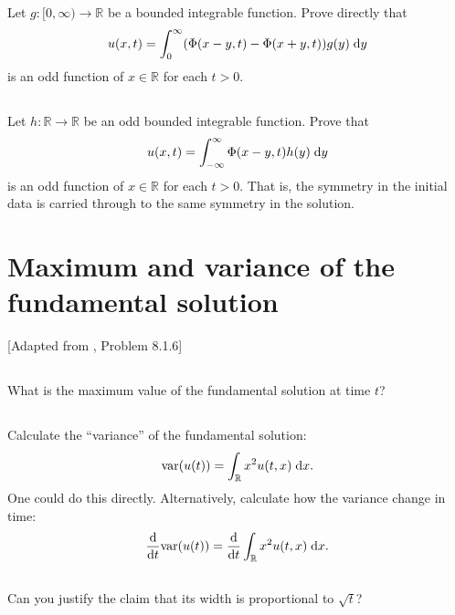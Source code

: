 \documentclass[11pt,letterpaper]{article}
\begin{document}
\subsection{}
Let $g:[0,\infty)\to\mathbb{R}$ be a bounded integrable function. Prove directly that
\begin{align}
    u(x,t)=\int_0^\infty (\Phi(x-y,t)-\Phi(x+y,t))g(y)\;\mathrm{d} y
\end{align}
is an odd function of $x\in\mathbb{R}$ for each $t>0$.

\subsection{}
Let $h:\mathbb{R}\to\mathbb{R}$ be an odd bounded integrable function. Prove that
\begin{align}
    u(x,t)=\int^\infty_{-\infty} \Phi(x-y,t)h(y)\;\mathrm{d} y
\end{align}
is an odd function of $x\in\mathbb{R}$ for each $t > 0$. That is, the symmetry in the initial data is carried through to the same symmetry in the solution.

\section{Maximum and variance of the fundamental solution}
[Adapted from \cite{Olver_14}, Problem 8.1.6]

\subsection{}
What is the maximum value of the fundamental solution at time $t$?

\subsection{}
Calculate the ``variance'' of the fundamental solution:
\begin{align}
    \text{var}(u(t)) = \int_\mathbb{R} x^2 u(t,x)\;\mathrm{d} x.
\end{align}
One could do this directly. Alternatively, calculate how the variance change in time:
\begin{align}
    \frac{\mathrm{d}}{\mathrm{d} t}\text{var}(u(t)) = \frac{\mathrm{d}}{\mathrm{d} t}\int_\mathbb{R} x^2 u(t,x)\;\mathrm{d} x.
\end{align}

\subsection{}
Can you justify the claim that its width is proportional to $\sqrt{t}$?
\end{document}
